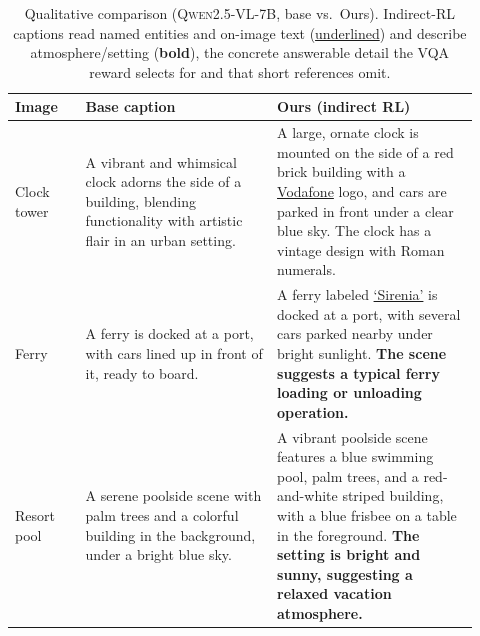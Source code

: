 \begin{table}[t]
\caption{Qualitative comparison (\textsc{Qwen2.5-VL-7B}, base vs.\ Ours). Indirect-RL captions read named
entities and on-image text (\underline{underlined}) and describe atmosphere/setting (\textbf{bold}), the concrete
answerable detail the VQA reward selects for and that short references omit.}
\label{tab:cap_examples}
\begin{center}
\small
\begin{tabular}{p{0.14\linewidth} p{0.38\linewidth} p{0.40\linewidth}}
\toprule
Image & Base caption & Ours (indirect RL) \\
\midrule
Clock tower &
A vibrant and whimsical clock adorns the side of a building, blending functionality with artistic flair in an
urban setting. &
A large, ornate clock is mounted on the side of a red brick building with a \underline{Vodafone} logo, and cars
are parked in front under a clear blue sky. The clock has a vintage design with Roman numerals. \\
\midrule
Ferry &
A ferry is docked at a port, with cars lined up in front of it, ready to board. &
A ferry labeled \underline{`Sirenia'} is docked at a port, with several cars parked nearby under bright sunlight.
\textbf{The scene suggests a typical ferry loading or unloading operation.} \\
\midrule
Resort pool &
A serene poolside scene with palm trees and a colorful building in the background, under a bright blue sky. &
A vibrant poolside scene features a blue swimming pool, palm trees, and a red-and-white striped building, with a
blue frisbee on a table in the foreground. \textbf{The setting is bright and sunny, suggesting a relaxed vacation
atmosphere.} \\
\bottomrule
\end{tabular}
\end{center}
\end{table}
